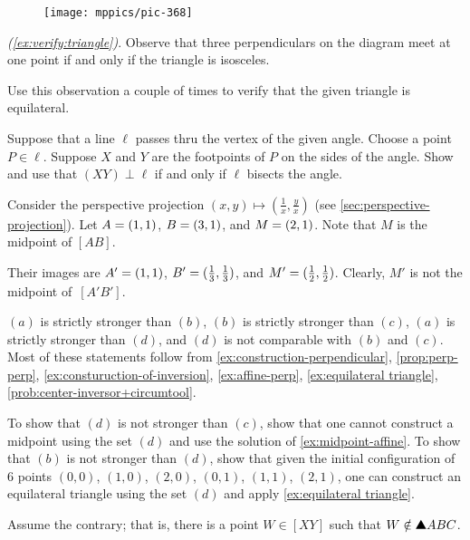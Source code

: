 \begin{wrapfigure}[8]{r}{21mm}
\vskip-6mm
\centering
\texttt{[image: mppics/pic-368]}
\end{wrapfigure}

\parbf{\ref{ex:equilateral triangle-verify},} \textit{(\ref{ex:verify:triangle})}.
Observe that three perpendiculars on the diagram meet at one point if and only if the triangle is isosceles.

Use this observation a couple of times to verify that the given triangle is equilateral.


Suppose that a line $\ell$ passes thru the vertex of the given angle.
Choose a point $P\in \ell$.
Suppose $X$ and $Y$ are the footpoints of $P$ on the sides of the angle.
Show and use that $(XY)\perp \ell$ if and only if $\ell$ bisects the angle.

Consider the perspective projection 
$(x,y)\mapsto (\tfrac 1x,\tfrac yx)$ (see \ref{sec:perspective-projection}).
Let $A=(1,1)$, $B=(3,1)$, and $M=(2,1)$.
Note that $M$ is the midpoint of $[AB]$.

Their images are $A'=(1,1)$, $B'=(\tfrac13,\tfrac13)$, and $M'=(\tfrac12,\tfrac12)$.
Clearly, $M'$ is not the midpoint of~$[A'B']$.


$(a)$ is strictly stronger than $(b)$,
$(b)$ is strictly stronger than $(c)$,
$(a)$ is strictly stronger than $(d)$,
and $(d)$ is not comparable with $(b)$ and $(c)$.
Most of these statements follow from \ref{ex:construction-perpendicular},
\ref{prop:perp-perp},
\ref{ex:consturuction-of-inversion},
\ref{ex:affine-perp},
\ref{ex:equilateral triangle}, 
\ref{prob:center-inversor+circumtool}.

To show that $(d)$ is not stronger than $(c)$, show that one cannot construct a midpoint using the set $(d)$ and use the solution of \ref{ex:midpoint-affine}.
To show that $(b)$ is not stronger than $(d)$, show that given the initial configuration of 6 points 
$(0,0)$, 
$(1,0)$,
$(2,0)$,
$(0,1)$, 
$(1,1)$,
$(2,1)$,
one can construct an equilateral triangle using the set $(d)$ and apply \ref{ex:equilateral triangle}.

\setcounter{eqtn}{0} 

Assume the contrary; 
that is, there is a point $W\in [XY]$ such that $W\notin\solidtriangle ABC$.

